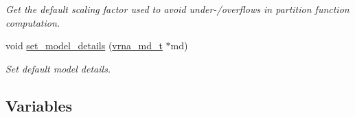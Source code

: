 \begin{DoxyCompactItemize}
\begin{DoxyCompactList}\small\item\em Get the default scaling factor used to avoid under-\//overflows in partition function computation. \end{DoxyCompactList}\item 
void \hyperlink{group__model__details_gabad896c3650d420f3f3ddefc69e2bceb}{set\-\_\-model\-\_\-details} (\hyperlink{group__model__details_ga1f8a10e12a0a1915f2a4eff0b28ea17c}{vrna\-\_\-md\-\_\-t} $\ast$md)
\begin{DoxyCompactList}\small\item\em Set default model details. \end{DoxyCompactList}\end{DoxyCompactItemize}
\subsection*{Variables}

